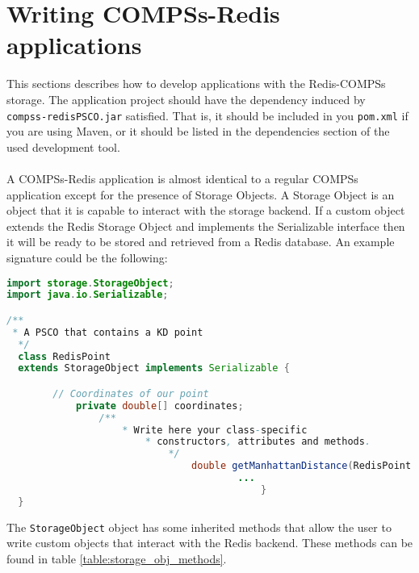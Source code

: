 \documentclass{article}
\begin{document}
\section{Writing COMPSs-Redis applications}
This sections describes how to develop applications with the Redis-COMPSs storage. The application project should have the dependency induced by \\ \verb|compss-redisPSCO.jar| satisfied. That is, it should be included in you \verb|pom.xml| if you are using Maven, or it should be listed in the dependencies section of the used development tool.\\
\\
A COMPSs-Redis application is almost identical to a regular COMPSs application except for the presence of Storage Objects. A Storage Object is an object that it is capable to interact with the storage backend. If a custom object extends the Redis Storage Object and implements the Serializable interface then it will be ready to be stored and retrieved from a Redis database. An example signature could be the following:
\newpage
\begin{lstlisting}[language=java]
import storage.StorageObject;
import java.io.Serializable;

/**
 * A PSCO that contains a KD point
  */
  class RedisPoint 
  extends StorageObject implements Serializable {

        // Coordinates of our point
            private double[] coordinates;
                /**
                    * Write here your class-specific
                        * constructors, attributes and methods.
                            */
                                double getManhattanDistance(RedisPoint other) {
                                        ...
                                            }
  }
  \end{lstlisting}
  The \verb|StorageObject| object has some inherited methods that allow the user to write custom objects that interact with the Redis backend. These methods can be found in table \ref{table:storage_obj_methods}.
\end{document}
